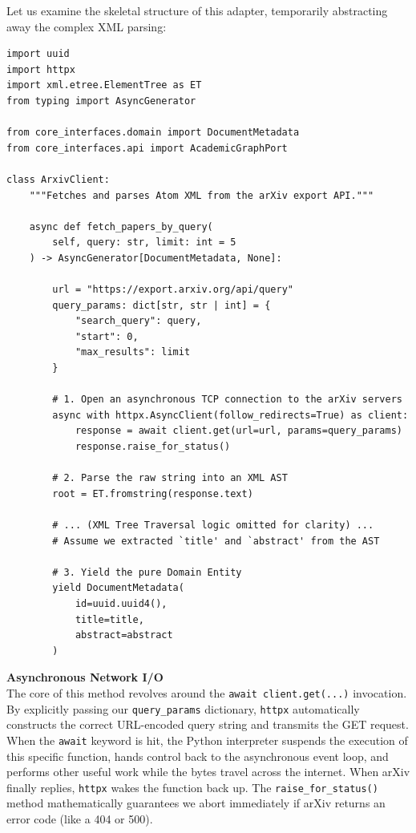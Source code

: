 Let us examine the skeletal structure of this adapter, temporarily abstracting away the complex XML parsing:

\begin{lstlisting}[caption={The arXiv API Adapter (Simplified)}]
import uuid
import httpx
import xml.etree.ElementTree as ET
from typing import AsyncGenerator

from core_interfaces.domain import DocumentMetadata
from core_interfaces.api import AcademicGraphPort

class ArxivClient:
    """Fetches and parses Atom XML from the arXiv export API."""

    async def fetch_papers_by_query(
        self, query: str, limit: int = 5
    ) -> AsyncGenerator[DocumentMetadata, None]:

        url = "https://export.arxiv.org/api/query"
        query_params: dict[str, str | int] = {
            "search_query": query,
            "start": 0,
            "max_results": limit
        }

        # 1. Open an asynchronous TCP connection to the arXiv servers
        async with httpx.AsyncClient(follow_redirects=True) as client:
            response = await client.get(url=url, params=query_params)
            response.raise_for_status()

        # 2. Parse the raw string into an XML AST
        root = ET.fromstring(response.text)

        # ... (XML Tree Traversal logic omitted for clarity) ...
        # Assume we extracted `title' and `abstract' from the AST

        # 3. Yield the pure Domain Entity
        yield DocumentMetadata(
            id=uuid.uuid4(),
            title=title,
            abstract=abstract
        )
\end{lstlisting}

\textbf{Asynchronous Network I/O} \\
The core of this method revolves around the \texttt{await client.get(...)} invocation. By explicitly passing our \texttt{query\_params} dictionary, \texttt{httpx} automatically constructs the correct URL-encoded query string and transmits the GET request. When the \texttt{await} keyword is hit, the Python interpreter suspends the execution of this specific function, hands control back to the asynchronous event loop, and performs other useful work while the bytes travel across the internet. When arXiv finally replies, \texttt{httpx} wakes the function back up. The \texttt{raise\_for\_status()} method mathematically guarantees we abort immediately if arXiv returns an error code (like a 404 or 500).


